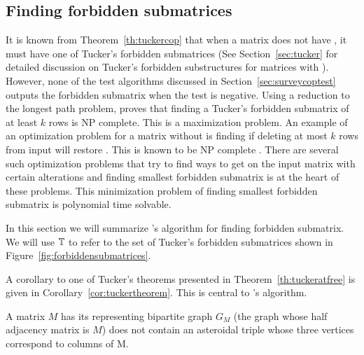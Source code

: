 \subsection{Finding forbidden submatrices}
\label{sec:forbiddensubalgo}


It is known from Theorem~\ref{th:tuckercop} that when a matrix does
not have \COP, it must have one of Tucker's forbidden submatrices (See
Section~\ref{sec:tucker} for detailed discussion on Tucker's forbidden
substructures for matrices with \COP). However, none of the \COP test
algorithms discussed in Section~\ref{sec:surveycoptest} outputs the
forbidden submatrix when the test is negative.  Using a reduction to
the longest path problem, \cite{v82} proves that finding a Tucker's
forbidden submatrix of at least $k$ rows is NP complete. This is a
maximization problem.  An example of an optimization problem for a
matrix without \COP is finding if deleting at most $k$ rows from input
will restore \COP. This is known to be NP complete
\cite{b75-phd}. There are several such optimization problems that try
to find ways to get \COP on the input matrix with certain alterations
and finding smallest forbidden submatrix is at the heart of these
problems. This minimization problem of finding smallest forbidden
submatrix is polynomial time solvable.


In this section we will summarize \cite{d08phd}'s algorithm for
finding forbidden submatrix. We will use $\mathbb{T}$ to refer to the
set of Tucker's forbidden submatrices shown in
Figure~\ref{fig:forbiddensubmatrices}.


A corollary to one of Tucker's theorems presented in
Theorem~\ref{th:tuckeratfree} is given in
Corollary~\ref{cor:tuckertheorem}. This is central to \cite{d08phd}'s
algorithm.

\begin{corollary}
  \label{cor:tuckertheorem}
  A matrix $M$ has \COP \iff its representing bipartite graph $G_M$
  (the graph whose half adjacency matrix is $M$) does not contain an
  asteroidal triple whose three vertices correspond to columns of M.
\end{corollary}

